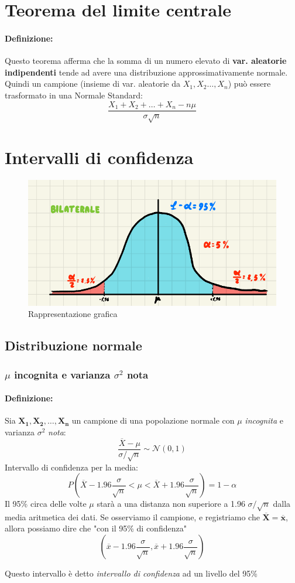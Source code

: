 \documentclass[]{article}
\newcommand{\definizione}{\paragraph{Definizione:}}
\begin{document}
    \section{Teorema del limite centrale}
    \definizione Questo teorema afferma che la somma di un numero elevato di \textbf{var. aleatorie indipendenti} tende ad avere una distribuzione approssimativamente normale.\\
    Quindi un campione (insieme di var. aleatorie da $X_1, X_2\ldots, X_n$) può essere trasformato in una Normale Standard:
    \[ \frac{X_1 + X_2 + \ldots + X_n - n\mu}{\sigma \sqrt{n}} \]
    \section{Intervalli di confidenza}
    \begin{figure}[H]
        \caption{Rappresentazione grafica}
        \includegraphics[width=\textwidth]{images/boh_16.png}
    \end{figure}
    \subsection{Distribuzione normale}
    \subsubsection{$\mu$ incognita e varianza  $\sigma^2$ nota}
    \definizione Sia $\boldsymbol{X_1, X_2, \ldots, X_n}$ un campione di una popolazione normale con $\mu$ \textit{incognita} e varianza $\sigma^2$ \textit{nota}:
    \[ \frac{\overline{X} - \mu}{\sigma / \sqrt{n}} \sim \mathcal{N}(0,1) \]
    Intervallo di confidenza per la media:
    \[ P \left( \overline{X} - 1.96 \frac{\sigma}{\sqrt{n}} < \mu < \overline{X} + 1.96 \frac{\sigma}{\sqrt{n}}\right) = 1-\alpha \]
    Il 95\% circa delle volte $\mu$ starà a una distanza non superiore a 1.96 $\sigma / \sqrt{n}$ dalla
    media aritmetica dei dati. Se osserviamo il campione, e registriamo che $\boldsymbol{\overline{X} = \overline{x}}$, allora possiamo dire che "con il 95\% di confidenza"
    \[ \left( \overline{x} - 1.96 \frac{\sigma}{\sqrt{n}}, \overline{x} + 1.96 \frac{\sigma}{\sqrt{n}} \right) \]
    \centerline{Questo intervallo è detto \textit{intervallo di confidenza} ad un livello del 95\%}
\end{document}
